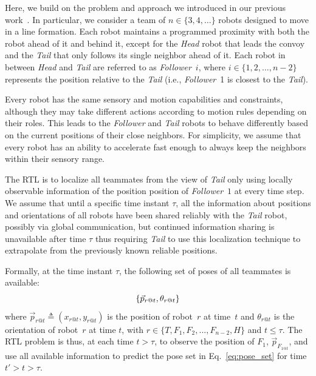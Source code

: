 \documentclass[letterpaper, 10 pt, conference]{ieeeconf}  %
\begin{document}
    Here, we build on the problem and approach we introduced in our previous
    work~\cite{CPR17}. In particular, we consider a team of $n \in
    \{3,4,\dots\}$ robots designed to move in a line formation.
    Each robot maintains a programmed
    proximity with both the robot ahead of it and behind it, except for
    the \emph{Head} robot that leads the convoy and the \emph{Tail}
    that only follows its single neighbor ahead of it. Each robot in
    between \emph{Head} and \emph{Tail} are referred to as
    \emph{Follower}~$i$, where $i \in \{1, 2, \dots, n-2\}$ represents
    the position relative to the \emph{Tail} (i.e., \emph{Follower}~1 is
    closest to the \emph{Tail}).

    Every robot has the same sensory and motion capabilities and
    constraints, although they may take different actions according to
    motion rules depending on their roles. This leads to the
    \emph{Follower} and \emph{Tail} robots to behave differently based
    on the current positions of their close neighbors. For simplicity,
    we assume that every robot has an ability to accelerate fast enough
    to always keep the neighbors within their sensory range.

    The RTL is to localize all teammates from the view of \emph{Tail}
    only using locally observable information of the position position
    of \emph{Follower}~$1$ at every time step. We assume that until a
    specific time instant $\tau$, all the information about positions
    and orientations of all robots have been shared reliably with the
    \emph{Tail} robot, possibly via global communication, but continued
    information sharing is unavailable after time $\tau$ thus requiring
    \emph{Tail} to use this localization technique to extrapolate from
    the previously known reliable positions.

    Formally, at the time instant $\tau$, the following set of poses of
    all teammates is available:
	\begin{equation}
		\{\vec{p}_{r@t},\theta_{r@t}\} \\
	    \label{eq:pose_set}
	\end{equation}
    where $\vec{p}_{r@t} \triangleq (x_{r@t}, y_{r@t})$ is the position
    of robot~$r$ at time~$t$ and $\theta_{r@t}$ is the orientation of
    robot~$r$ at time $t$, with $r \in \{T, F_{1}, F_{2}, ..., F_{n-2},
    H\}$ and $t \leq \tau$. The RTL problem is thus, at each time $t >
    \tau$, to observe the position of $F_1$, $\vec{p}_{F_{1@t}}$, and
    use all available information to predict the pose set in
    Eq.~\eqref{eq:pose_set} for time $t' > t > \tau$.
\end{document}
